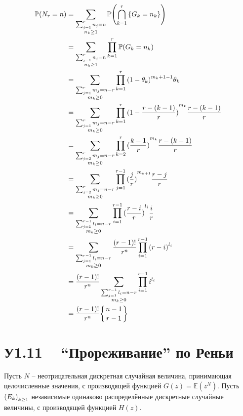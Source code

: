 \documentclass[a4paper]{article}
\let\originalleft\left
\let\originalright\right
\renewcommand{\left}{\mathopen{}\mathclose\bgroup\originalleft}
\renewcommand{\right}{\aftergroup\egroup\originalright}
\newcommand{\obj}[1]{{\left\{ #1 \right \}}}
\newcommand{\brac}[1]{{\left ( #1 \right )}}
\newcommand{\Ex}[0]{{\mathbb{E}}}
\newcommand{\pr}[0]{{\mathbb{P}}}
\begin{document}
\begin{align*}
\pr\brac{N_r = n}
	&= \sum_{\substack{\sum_{j=1}^r n_j = n \\ n_k\geq1}} \pr\brac{\bigcap_{k=1}^r \obj{G_k = n_k}} \\
	&= \sum_{\substack{\sum_{j=1}^r n_j = n \\ n_k\geq1}} \prod_{k=1}^r \pr\brac{G_k = n_k} \\
	&= \sum_{\substack{\sum_{j=1}^r m_j = n-r \\ m_k\geq0}} \prod_{k=1}^r {(1-\theta_k)}^{m_k+1-1} \theta_k \\
	&= \sum_{\substack{\sum_{j=1}^r m_j = n-r \\ m_k\geq0}} \prod_{k=1}^r {(1-\frac{r-(k-1)}{r})}^{m_k} \frac{r-(k-1)}{r} \\
	&= \sum_{\substack{\sum_{j=2}^r m_j = n-r \\ m_k\geq0}} \prod_{k=2}^r {(\frac{k-1}{r})}^{m_k} \frac{r-(k-1)}{r} \\
	&= \sum_{\substack{\sum_{j=2}^r m_j = n-r \\ m_k\geq0}} \prod_{j=1}^{r-1} {(\frac{j}{r})}^{m_{k+1}} \frac{r-j}{r} \\
	&= \sum_{\substack{\sum_{j=1}^{r-1} l_i = n-r \\ m_k\geq0}} \prod_{i=1}^{r-1} {(\frac{r-i}{r})}^{l_i} \frac{i}{r} \\
	&= \sum_{\substack{\sum_{j=1}^{r-1} l_i = n-r \\ m_k\geq0}} \frac{(r-1)!}{r^n} \prod_{i=1}^{r-1} {(r-i)}^{l_i} \\
	&= \frac{(r-1)!}{r^n} \sum_{\substack{\sum_{j=1}^{r-1} l_i = n-r \\ m_k\geq0}} \prod_{i=1}^{r-1} i^{l_i} \\
	& =  \frac{(r-1)!}{r^n} \obj{n-1 \atop r-1}
\end{align*}




\section{У1.11 -- ``Прореживание'' по Реньи} %
\label{sec:task_1_11}

Пусть $N$ -- неотрицательная дискретная случайная величина, принимающая
целочисленные значения, с производящей функцией $G(z) = \Ex(z^N)$.
Пусть $\brac{E_k}_{k\geq 1}$ независимые одинаково распределённые дискретные
случайные величины, с производящей функцией $H(z)$.
\end{document}
